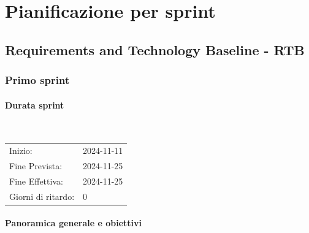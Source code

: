 \documentclass[10pt]{article}
\begin{document}
{\newpage


\section{Pianificazione per sprint}
\label{pianificazione}

\subsection{Requirements and Technology Baseline - RTB}


\subsubsection{Primo sprint}
\label{primo-sprint$_G$}
    
    \paragraph{Durata sprint}\mbox{}\\
    \vspace{-1.5em}
    \begin{table}[h] 
    \renewcommand{\arraystretch}{1.2}  
    \begin{tabular}{ l l }
        Inizio: & 2024-11-11 \\
        Fine Prevista: & 2024-11-25 \\
        Fine Effettiva: & 2024-11-25 \\
        Giorni di ritardo: & 0 \\
    \end{tabular}
    \end{table}
    \vspace{-2em}
    {\renewcommand{\arraystretch}{1.5}%
    
    \paragraph{Panoramica generale e obiettivi}\mbox{}\vspace{0.4em}
    
}}
\end{document}
